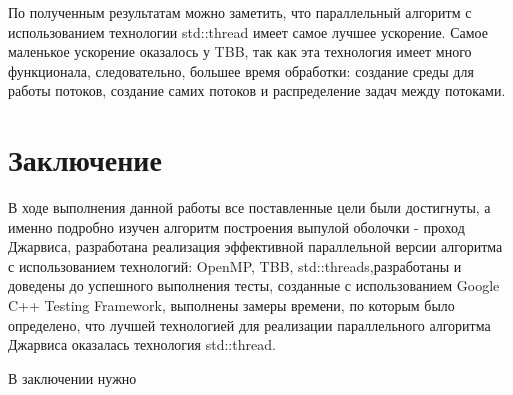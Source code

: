 \documentclass{article}
\begin{document}
\par По полученным результатам можно заметить, что параллельный алгоритм с использованием технологии std::thread имеет самое лучшее ускорение. Самое маленькое ускорение оказалось у TBB, так как эта технология имеет много функционала, следовательно, большее время обработки: создание среды для работы потоков, создание самих потоков и распределение задач между потоками.

\newpage

\section{Заключение}
В ходе выполнения данной работы все поставленные цели были достигнуты, а именно подробно изучен алгоритм построения выпулой оболочки - проход Джарвиса, разработана реализация эффективной параллельной версии алгоритма с использованием технологий: OpenMP, TBB, std::threads,разработаны и доведены до успешного выполнения тесты, созданные с использованием Google C++ Testing Framework, выполнены замеры времени, по которым было определено, что лучшей технологией для реализации параллельного алгоритма Джарвиса оказалась технология std::thread.

В заключении нужно
\end{document}
